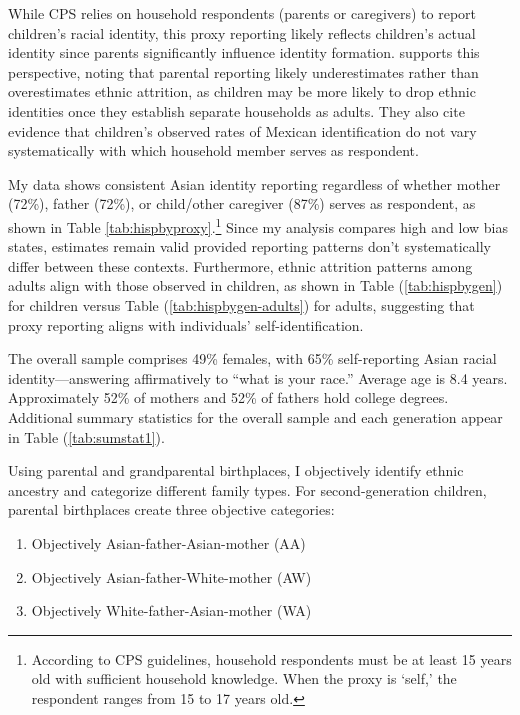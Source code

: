 While CPS relies on household respondents (parents or caregivers) to report children's racial identity, this proxy reporting likely reflects children's actual identity since parents significantly influence identity formation. \textcite{antmanEthnicAttritionAssimilation2020} supports this perspective, noting that parental reporting likely underestimates rather than overestimates ethnic attrition, as children may be more likely to drop ethnic identities once they establish separate households as adults. They also cite evidence that children's observed rates of Mexican identification do not vary systematically with which household member serves as respondent. 

My data shows consistent Asian identity reporting regardless of whether mother (72\%), father (72\%), or child/other caregiver (87\%) serves as respondent, as shown in Table \ref{tab:hispbyproxy}.\footnote{According to CPS guidelines, household respondents must be at least 15 years old with sufficient household knowledge. When the proxy is `self,' the respondent ranges from 15 to 17 years old.} Since my analysis compares high and low bias states, estimates remain valid provided reporting patterns don't systematically differ between these contexts. Furthermore, ethnic attrition patterns among adults align with those observed in children, as shown in Table (\ref{tab:hispbygen}) for children versus Table (\ref{tab:hispbygen-adults}) for adults, suggesting that proxy reporting aligns with individuals' self-identification.

The overall sample comprises 49\% females, with 65\% self-reporting Asian racial identity---answering affirmatively to ``what is your race.'' Average age is 8.4 years. Approximately 52\% of mothers and 52\% of fathers hold college degrees. Additional summary statistics for the overall sample and each generation appear in Table (\ref{tab:sumstat1}).

Using parental and grandparental birthplaces, I objectively identify ethnic ancestry and categorize different family types. For second-generation children, parental birthplaces create three objective categories:
\begin{enumerate}
\item Objectively Asian-father-Asian-mother (AA)
\item Objectively Asian-father-White-mother (AW)  
\item Objectively White-father-Asian-mother (WA)
\end{enumerate}


